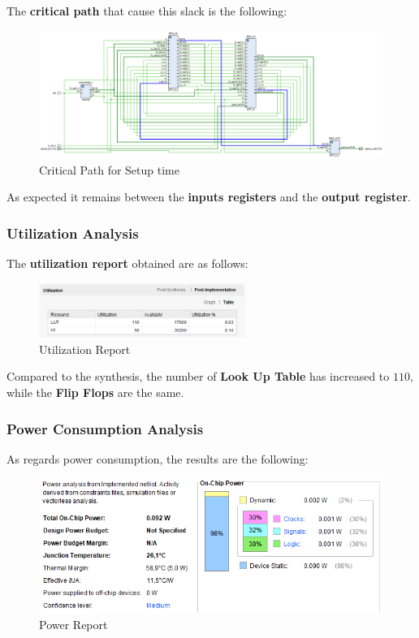 The \textbf{critical path} that cause this slack is the following:

\begin{figure}[H]
    \centering
    \includegraphics[width=1\textwidth]{img/Chapter5/ImplementationSetupCrit.png}
    \caption{Critical Path for Setup time}
    \label{fig:ICPS}
\end{figure}

As expected it remains between the \textbf{inputs registers} and the \textbf{output register}.

\subsubsection{Utilization Analysis}

The \textbf{utilization report} obtained are as follows:

\begin{figure}[H]
    \centering
    \includegraphics[width=0.6\textwidth]{img/Chapter5/ImplementationUtilization.png}
    \caption{Utilization Report}
    \label{fig:IU}
\end{figure}

Compared to the synthesis, the number of \textbf{Look Up Table} has increased to $110$, while the \textbf{Flip Flops} are the same.

\subsubsection{Power Consumption Analysis}

As regards power consumption, the results are the following:

\begin{figure}[H]
    \centering
    \includegraphics[width=1\textwidth]{img/Chapter5/ImplementationPower.png}
    \caption{Power Report}
    \label{fig:IPR}
\end{figure}

